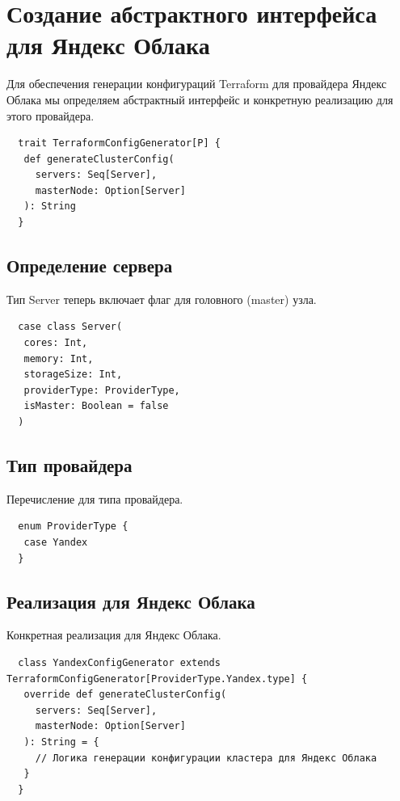   \section{Создание абстрактного интерфейса для Яндекс Облака}
  
  Для обеспечения генерации конфигураций Terraform для провайдера Яндекс Облака
мы определяем абстрактный интерфейс и конкретную реализацию для этого
провайдера.
  
  \begin{verbatim}
  trait TerraformConfigGenerator[P] {
   def generateClusterConfig(
     servers: Seq[Server],
     masterNode: Option[Server]
   ): String
  }
  \end{verbatim}
  
  \subsection{Определение сервера}
  
  Тип Server теперь включает флаг для головного (master) узла.
  
  \begin{verbatim}
  case class Server(
   cores: Int,
   memory: Int,
   storageSize: Int,
   providerType: ProviderType,
   isMaster: Boolean = false
  )
  \end{verbatim}
  
  \subsection{Тип провайдера}
  
  Перечисление для типа провайдера.
  
  \begin{verbatim}
  enum ProviderType {
   case Yandex
  }
  \end{verbatim}
  
  \subsection{Реализация для Яндекс Облака}
  
  Конкретная реализация для Яндекс Облака.
  
  \begin{verbatim}
  class YandexConfigGenerator extends
TerraformConfigGenerator[ProviderType.Yandex.type] {
   override def generateClusterConfig(
     servers: Seq[Server],
     masterNode: Option[Server]
   ): String = {
     // Логика генерации конфигурации кластера для Яндекс Облака
   }
  }
  \end{verbatim}
  
